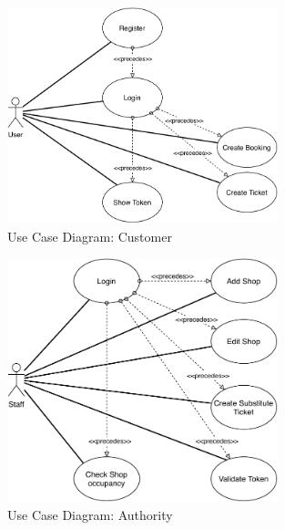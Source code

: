 \begin{figure}[H]
    \centering
    \includegraphics[width=0.7\textwidth]{Images/usecasediagram-user.pdf}
    \caption{Use Case Diagram: Customer}
\end{figure}
\begin{figure}[H]
    \centering
    \includegraphics[width=0.7\textwidth]{Images/usecasediagram-staff.pdf}
    \caption{Use Case Diagram: Authority}
\end{figure}

